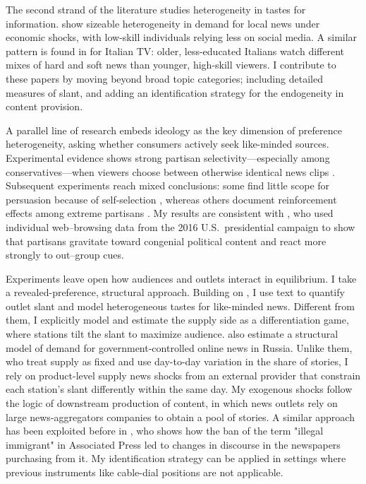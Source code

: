 \documentclass[12pt]{article}
\begin{document}
The second strand of the literature studies heterogeneity in tastes for information. \citet{bang2023} show sizeable heterogeneity in demand for local news under economic shocks, with low-skill individuals relying less on social media. A similar pattern is found in \citet{gambaro2021revealed} for Italian TV: older, less-educated Italians watch different mixes of hard and soft news than younger, high-skill viewers. I contribute to these papers by moving beyond broad topic categories;  including detailed measures of slant, and adding an identification strategy for the endogeneity in content provision. 



A parallel line of research embeds ideology as the key dimension of preference heterogeneity, asking whether consumers actively seek like-minded sources. Experimental evidence shows strong partisan selectivity—especially among conservatives—when viewers choose between otherwise identical news clips \citep{Iyengar2009RedMB}. Subsequent experiments reach mixed conclusions: some find little scope for persuasion because of self-selection \citep{arceneaux_johnson_2013}, whereas others document reinforcement effects among extreme partisans \citep{levendusky}. My results are consistent with \citet{Peterson2017Echo}, who used individual web–browsing data from the 2016 U.S.\ presidential campaign to show that partisans gravitate toward congenial political content and react more strongly to out–group cues. 


Experiments leave open how audiences and outlets interact in equilibrium. I take a revealed-preference, structural approach. Building on \citet{gentzkow2010media}, I use text to quantify outlet slant and model heterogeneous tastes for like-minded news. Different from them, I explicitly model and estimate the supply side as a differentiation game, where stations tilt the slant to maximize audience.  \citet{SimonovRao2022} also estimate a structural model of demand for government-controlled online news in Russia. Unlike them, who treat supply as fixed and use day-to-day variation in the share of  stories, I rely on product-level supply news shocks from an external provider that constrain each station’s slant differently within the same day. My exogenous shocks follow the logic of downstream production of content, in which news outlets rely on large news-aggregators companies to obtain a pool of stories. A similar approach  has been exploited before  in \cite{milena}, who shows how the ban of the term "illegal immigrant" in  Associated Press led to changes in discourse in the  newspapers purchasing from it. My identification strategy can be applied in settings where previous instruments like cable-dial positions \citep{martin2017} are not applicable. 
\end{document}
